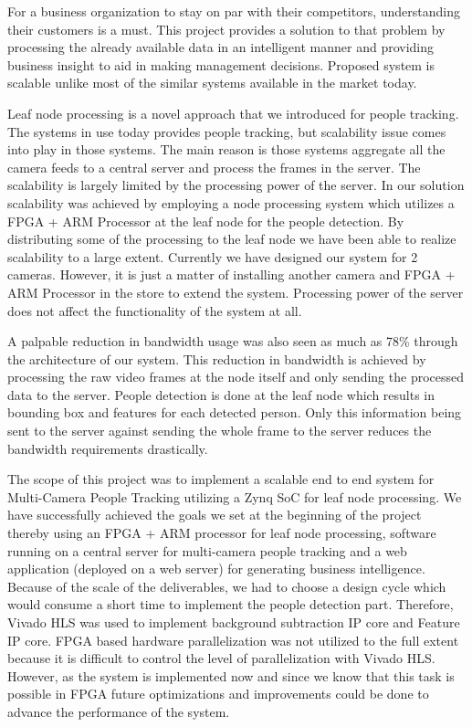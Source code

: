 \documentclass[12pt,a4paper]{report}
\begin{document}
For a business organization to stay on par with their competitors, understanding their customers is a must. This project provides a solution to that problem by processing the already available data in an intelligent manner and providing business insight to aid in making management decisions. Proposed system is scalable unlike most of the similar systems available in the market today.\\
\par Leaf node processing is a novel approach that we introduced for people tracking. The systems in use today provides people tracking, but scalability issue comes into play in those systems. The main reason is those systems aggregate all the camera feeds to a central server and process the frames in the server. The scalability is largely limited by the processing power of the server. In our solution scalability was achieved by employing a node processing system which utilizes a FPGA + ARM Processor at the leaf node for the people detection. By distributing some of the processing to the leaf node we have been able to realize scalability to a large extent. Currently we have designed our system for 2 cameras. However, it is just a matter of installing another camera and FPGA + ARM Processor in the store to extend the system. Processing power of the server does not affect the functionality of the system at all.\\
\par A palpable reduction in bandwidth usage was also seen as much as 78\% through the architecture of our system. This reduction in bandwidth is achieved by processing the raw video frames at the node itself and only sending the processed data to the server. People detection is done at the leaf node which results in bounding box and features for each detected person.  Only this information being sent to the server against sending the whole frame to the server reduces the bandwidth requirements drastically. \\
\par The scope of this project was to implement a scalable end to end system for Multi-Camera People Tracking utilizing a Zynq SoC for leaf node processing. We have successfully achieved the goals we set at the beginning of the project thereby using an FPGA + ARM processor for leaf node processing, software running on a central server for multi-camera people tracking and a web application (deployed on a web server) for generating business intelligence. Because of the scale of the deliverables, we had to choose a design cycle which would consume a short time to implement the people detection part. Therefore, Vivado HLS was used to implement background subtraction IP core and Feature IP core. FPGA based hardware parallelization was not utilized to the full extent because it is difficult to control the level of parallelization with Vivado HLS. However, as the system is implemented now and since we know that this task is possible in FPGA future optimizations and improvements could be done to advance the performance of the system.\\
\end{document}
